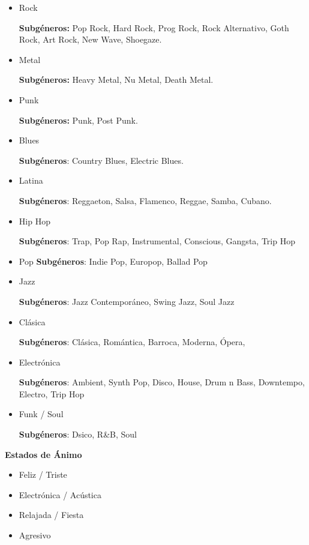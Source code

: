 \begin{itemize}
\itemsep0em
\item
  Rock
  
  \textbf{Subgéneros:} Pop Rock, Hard Rock, Prog Rock, Rock Alternativo, Goth Rock, Art Rock, New Wave, Shoegaze.

\item
  Metal
    
  \textbf{Subgéneros:} Heavy Metal, Nu Metal, Death Metal.
\item
  Punk

  \textbf{Subgéneros:} Punk, Post Punk.
\item
  Blues
    
  \textbf{Subgéneros}: Country Blues, Electric Blues.
\item
  Latina

  \textbf{Subgéneros}: Reggaeton, Salsa, Flamenco, Reggae, Samba, Cubano.

\item
  Hip Hop

    \textbf{Subgéneros}: Trap, Pop Rap, Instrumental, Conscious, Gangsta, Trip Hop

\item
  Pop
\textbf{Subgéneros}: Indie Pop, Europop, Ballad Pop

\item
  Jazz

\textbf{Subgéneros}: Jazz Contemporáneo, Swing Jazz, Soul Jazz

\item
  Clásica

\textbf{Subgéneros}: Clásica, Romántica, Barroca, Moderna, Ópera, 

\item
  Electrónica

\textbf{Subgéneros}: Ambient, Synth Pop, Disco, House, Drum n Bass, Downtempo, Electro, Trip Hop

\item
  Funk / Soul

\textbf{Subgéneros}: Dsico, R\&B, Soul

\end{itemize}
\textbf{Estados de Ánimo}

\begin{itemize}
\itemsep0em
\item
  Feliz / Triste
\item
  Electrónica / Acústica
\item
  Relajada / Fiesta
\item
  Agresivo
\end{itemize}

